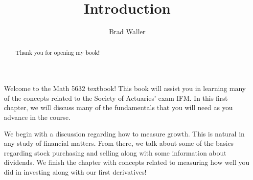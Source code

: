 \documentclass{ximera}
\title{Introduction}
\author{Brad Waller}
\begin{document}
\begin{abstract}
Thank you for opening my book!
\end{abstract}

\maketitle

Welcome to the Math 5632 textbook! This book will assist you in learning many of the concepts related to the Society of Actuaries' exam IFM. In this first chapter, we will discuss many of the fundamentals that you will need as you advance in the course.

We begin with a discussion regarding how to measure growth. This is natural in any study of financial matters. From there, we talk about some of the basics regarding stock purchasing and selling along with some information about dividends. We finish the chapter with concepts related to measuring how well you did in investing along with our first derivatives!
\end{document}
